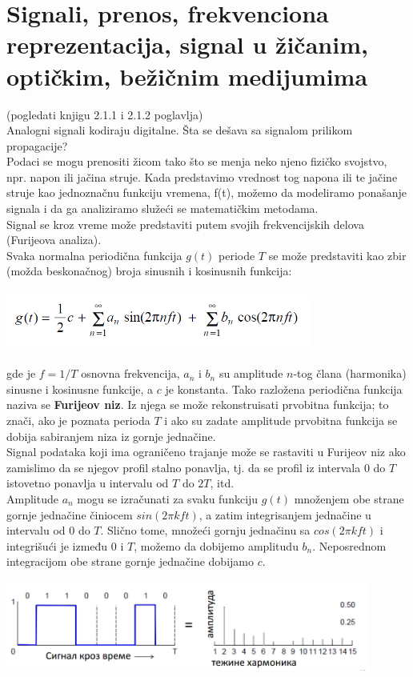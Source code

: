 \documentclass{article} %
\begin{document}
\section{Signali, prenos, frekvenciona reprezentacija, signal u žičanim, optičkim, bežičnim medijumima}
(pogledati knjigu 2.1.1 i 2.1.2 poglavlja)\\

Analogni signali kodiraju digitalne. Šta se dešava sa signalom prilikom propagacije?\\
Podaci se mogu prenositi žicom tako što se menja neko njeno fizičko svojstvo, npr. napon ili jačina struje. Kada predstavimo vrednost tog napona ili te jačine struje kao jednoznačnu funkciju vremena, f(t), možemo da modeliramo ponašanje signala i da ga analiziramo služeći se matematičkim metodama. \\

Signal se kroz vreme može predstaviti putem svojih frekvencijskih delova (Furijeova analiza).\\
Svaka normalna periodična funkcija $ g(t) $ periode $ T $ se može predstaviti kao zbir (možda beskonačnog) broja sinusnih i kosinusnih funkcija:
\begin{center}
\includegraphics[width=10cm, height=2cm]{furije}\\
\end{center}
gde je $ f = 1/T $ osnovna frekvencija, $ a_{n} $ i $ b_{n} $ su amplitude $ n$-tog člana (harmonika) sinusne i kosinusne funkcije, a $c$ je konstanta. Tako razložena periodična funkcija naziva se \textbf{Furijeov niz}. Iz njega se može rekonstruisati prvobitna funkcija; to znači, ako je poznata perioda $T$ i ako su zadate amplitude prvobitna funkcija se dobija sabiranjem niza iz gornje jednačine.\\

Signal podataka koji ima ograničeno trajanje može se rastaviti u Furijeov niz ako zamislimo da se njegov profil stalno ponavlja, tj. da se profil iz intervala $0$ do $T$ istovetno ponavlja u intervalu od $T$ do $2T$, itd.\\

Amplitude $a_{n}$ mogu se izračunati za svaku funkciju $g(t)$ množenjem obe strane gornje jednačine činiocem $sin(2 \pi kft)$, a zatim integrisanjem jednačine u intervalu od $0$ do $T$. Slično tome, množeći gornju jednačinu sa $cos(2 \pi kft)$ i integrišući je između $0$ i $T$, možemo da dobijemo amplitudu $ b_{n} $. Neposrednom integracijom obe strane gornje jednačine  dobijamo $c$.
\begin{center}
\includegraphics[width=12cm, height=3cm]{furije2}\\
\end{center}
\end{document}
